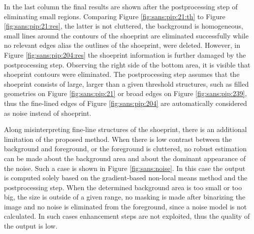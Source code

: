 \documentclass[draft,final]{vutinfth} %
\begin{document}
\par
In the last column the final results are shown after the postprocessing step of eliminating small regions.
Comparing Figure \ref{fig:sans:pip:21:th} to Figure \ref{fig:sans:pip:21:res}, the latter is not cluttered, the background is homogeneous, small lines around the contours of the shoeprint are eliminated successfully while no relevant edges alias the outlines of the shoeprint, were deleted.
However, in Figure \ref{fig:sans:pip:204:res} the shoeprint information is further damaged by the postprocessing step.
Observing the right side of the bottom area, it is visible that shoeprint contours were eliminated.
The postprocessing step assumes that the shoeprint consists of large, larger than a given threshold structures, such as filled geometries on Figure \ref{fig:sans:pip:21} or broad edges on Figure \ref{fig:sans:pip:239}, thus the fine-lined edges of Figure \ref{fig:sans:pip:204} are automatically considered as noise instead of shoeprint.

\par
Along misinterpreting fine-line structures of the shoeprint, there is an additional limitation of the proposed method.
When there is low contrast between the background and foreground, or the foreground is cluttered, no robust estimation can be made about the background area and about the dominant appearance of the noise. 
Such a case is shown in Figure \ref{fig:sans:noise}.
In this case the output is computed solely based on the gradient-based non-local means method and the postprocessing step.
When the determined background area is too small or too big, the size is outside of a given range, no masking is made after binarizing the image and no noise is eliminated from the foreground, since a noise model is not calculated.
In such cases enhancement steps are not exploited, thus the quality of the output is low. 

\end{document}
